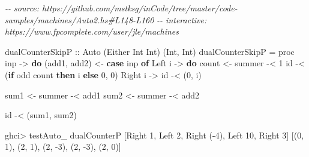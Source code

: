 \documentclass[]{article}
\newenvironment{Shaded}{}{}
\newcommand{\CommentTok}[1]{\textcolor[rgb]{0.38,0.63,0.69}{\textit{#1}}}
\newcommand{\DataTypeTok}[1]{\textcolor[rgb]{0.56,0.13,0.00}{#1}}
\newcommand{\DecValTok}[1]{\textcolor[rgb]{0.25,0.63,0.44}{#1}}
\newcommand{\FunctionTok}[1]{\textcolor[rgb]{0.02,0.16,0.49}{#1}}
\newcommand{\KeywordTok}[1]{\textcolor[rgb]{0.00,0.44,0.13}{\textbf{#1}}}
\newcommand{\NormalTok}[1]{#1}
\newcommand{\OperatorTok}[1]{\textcolor[rgb]{0.40,0.40,0.40}{#1}}
\newcommand{\OtherTok}[1]{\textcolor[rgb]{0.00,0.44,0.13}{#1}}
\begin{document}
\begin{Shaded}
\begin{Highlighting}[]
\CommentTok{{-}{-} source: https://github.com/mstksg/inCode/tree/master/code{-}samples/machines/Auto2.hs\#L148{-}L160}
\CommentTok{{-}{-} interactive: https://www.fpcomplete.com/user/jle/machines}

\OtherTok{dualCounterSkipP ::} \DataTypeTok{Auto}\NormalTok{ (}\DataTypeTok{Either} \DataTypeTok{Int} \DataTypeTok{Int}\NormalTok{) (}\DataTypeTok{Int}\NormalTok{, }\DataTypeTok{Int}\NormalTok{)}
\NormalTok{dualCounterSkipP }\OtherTok{=}\NormalTok{ proc inp }\OtherTok{{-}>} \KeywordTok{do}
\NormalTok{    (add1, add2) }\OtherTok{<{-}} \KeywordTok{case}\NormalTok{ inp }\KeywordTok{of}
                      \DataTypeTok{Left}\NormalTok{ i }\OtherTok{{-}>} \KeywordTok{do}
\NormalTok{                        count }\OtherTok{<{-}}\NormalTok{ summer }\OperatorTok{{-}<} \DecValTok{1}
                        \FunctionTok{id} \OperatorTok{{-}<}\NormalTok{ (}\KeywordTok{if} \FunctionTok{odd}\NormalTok{ count }\KeywordTok{then}\NormalTok{ i }\KeywordTok{else} \DecValTok{0}\NormalTok{, }\DecValTok{0}\NormalTok{)}
                      \DataTypeTok{Right}\NormalTok{ i }\OtherTok{{-}>}
                        \FunctionTok{id} \OperatorTok{{-}<}\NormalTok{ (}\DecValTok{0}\NormalTok{, i)}

\NormalTok{    sum1 }\OtherTok{<{-}}\NormalTok{ summer }\OperatorTok{{-}<}\NormalTok{ add1}
\NormalTok{    sum2 }\OtherTok{<{-}}\NormalTok{ summer }\OperatorTok{{-}<}\NormalTok{ add2}

    \FunctionTok{id} \OperatorTok{{-}<}\NormalTok{ (sum1, sum2)}
\end{Highlighting}
\end{Shaded}

\begin{Shaded}
\begin{Highlighting}[]
\NormalTok{ghci}\OperatorTok{>}\NormalTok{ testAuto\_ dualCounterP [}\DataTypeTok{Right} \DecValTok{1}\NormalTok{, }\DataTypeTok{Left} \DecValTok{2}\NormalTok{, }\DataTypeTok{Right}\NormalTok{ (}\OperatorTok{{-}}\DecValTok{4}\NormalTok{), }\DataTypeTok{Left} \DecValTok{10}\NormalTok{, }\DataTypeTok{Right} \DecValTok{3}\NormalTok{]}
\NormalTok{[(}\DecValTok{0}\NormalTok{, }\DecValTok{1}\NormalTok{), (}\DecValTok{2}\NormalTok{, }\DecValTok{1}\NormalTok{), (}\DecValTok{2}\NormalTok{, }\OperatorTok{{-}}\DecValTok{3}\NormalTok{), (}\DecValTok{2}\NormalTok{, }\OperatorTok{{-}}\DecValTok{3}\NormalTok{), (}\DecValTok{2}\NormalTok{, }\DecValTok{0}\NormalTok{)]}
\end{Highlighting}
\end{Shaded}
\end{document}
